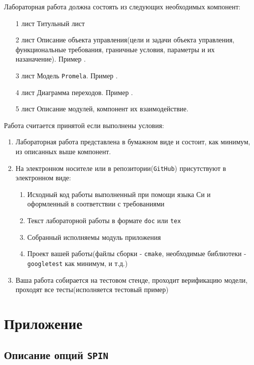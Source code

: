 \documentclass[12pt, twoside]{report}
\begin{document}
Лабораторная работа должна состоять из следующих необходимых компонент:
\begin{itemize}
  \item[ 1 лист ] Титульный лист
  \item[ 2 лист ] Описание объекта управления(цели и задачи объекта управления, функциональные требования, граничные условия, параметры и их назаначение). Пример .
  \item[ 3 лист ] Модель \texttt{Promela}. Пример .
  \item[ 4 лист ] Диаграмма переходов. Пример .
  \item[ 5 лист ] Описание модулей, компонент их взаимодействие.
\end{itemize}

Работа считается принятой если выполнены условия:
\begin{enumerate}
  \item Лабораторная работа представлена в бумажном виде и состоит, как минимум, из описанных выше компонент.
  \item На электронном носителе или в репозитории(\texttt{GitHub}) присутствуют в электронном виде:
    \begin{enumerate}
      \item Исходный код работы выполненный при помощи языка Си и оформленный в соответствии с требованиями 
      \item Текст лабораторной работы в формате \texttt{doc} или \texttt{tex}
      \item Собранный исполняемы модуль приложения
      \item Проект вашей работы(файлы сборки - \texttt{cmake}, необходимые библиотеки - \texttt{googletest} как минимум, и т.д.)
    \end{enumerate}
  \item Ваша работа собирается на тестовом стенде, проходит верификацию модели, проходят все тесты(исполняется тестовый пример)
\end{enumerate}


\newpage
\chapter*{Приложение}\label{addons}

\section*{Описание опций \texttt{SPIN}}\label{spin_quick_REFERENCE}
\end{document}
